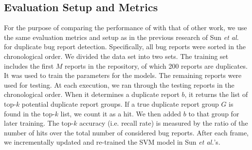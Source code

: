 



\subsection{Evaluation Setup and Metrics}

For the purpose of comparing the performance of {\model} with that of
other work, we use the same evaluation metrics and setup as in the
previous research of Sun {\em et al.}~\cite{davidlo10} for duplicate
bug report detection. 
%
Specifically, all bug reports were sorted in the chronological
order. We divided the data set into two sets.  The training set
includes the first $M$ reports in the repository, of which 200 reports
are duplicates.  It was used to train the parameters for the
models. The remaining reports were used for testing. At each
execution, we ran {\model} through the testing reports in the
chronological order. When it determines a duplicate report $b$, it
returns the list of top-$k$ potential duplicate report groups. If a
true duplicate report group $G$ is found in the top-$k$ list, we count
it as a hit. We then added $b$ to that group for later training. The
top-$k$ accuracy (i.e. recall rate) is measured by the ratio of the
number of hits over the total number of considered bug reports.  After
each frame, we incrementally updated {\model} and re-trained the SVM
model in Sun {\em et al.}'s.


